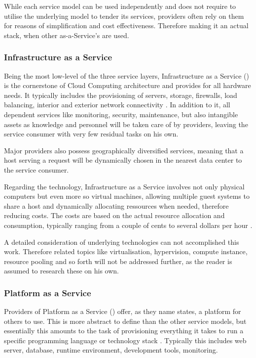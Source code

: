 While each service model can be used independently and does not require to utilise the underlying model to tender its services, providers often rely on them for reasons of simplification and cost effectiveness. Therefore making it an actual stack, when other as-a-Service's are used.

\subsubsection{Infrastructure as a Service}
\label{subsubsec:iaas}
Being the most low-level of the three service layers, Infrastructure as a Service () is the cornerstone of Cloud Computing architecture and provides for all hardware needs. It typically includes the provisioning of servers, storage, firewalls, load balancing, interior and exterior network connectivity \cite{mcgrath2012understanding}. In addition to it, all dependent services like monitoring, security, maintenance, but also intangible assets as knowledge and personnel will be taken care of by providers, leaving the service consumer with very few residual tasks on his own.

Major providers also possess geographically diversified services, meaning that a host serving a request will be dynamically chosen in the nearest data center to the service consumer.

\pagebreak

Regarding the technology, Infrastructure as a Service involves not only physical computers but even more so virtual machines, allowing multiple guest systems to share a host and dynamically allocating ressources when needed, therefore reducing costs. The costs are based on the actual resource allocation and consumption, typically ranging from a couple of cents to several dollars per hour \cite{website:aws-ec2-pricing}.

A detailed consideration of underlying technologies can not accomplished this work. Therefore related topics like virtualisation, hypervision, compute instance, resource pooling and so forth will not be addressed further, as the reader is assumed to research these on his own.

\subsubsection{Platform as a Service}
\label{subsubsec:paas}
Providers of Platform as a Service () offer, as they name states, a platform for others to use. This is more abstract to define than the other service models, but essentially this amounts to the task of provisioning everything it takes to run a specific programming language or technology stack \cite{mcgrath2012understanding}. Typically this includes web server, database, runtime environment, development tools, monitoring. 

